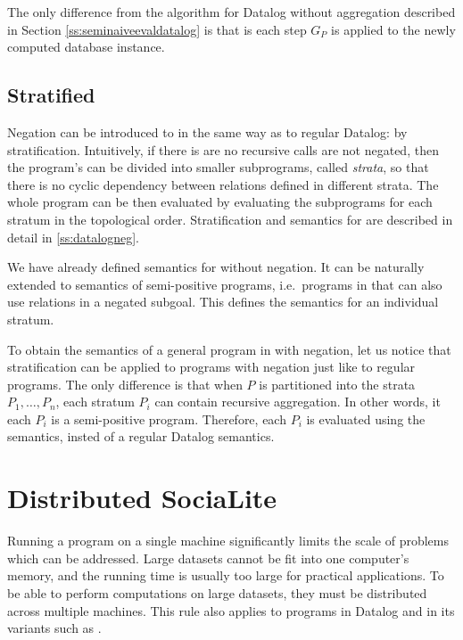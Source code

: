 The only difference from the algorithm for Datalog without aggregation described in Section \ref{ss:seminaiveevaldatalog} is that is each step $G_P$ is applied to the newly computed database instance.

\subsection{Stratified \datalogra}
Negation can be introduced to \datalogra in the same way as to regular Datalog: by stratification. Intuitively, if there is are no recursive calls are not negated, then the program's can be divided into smaller subprograms, called \emph{strata}, so that there is no cyclic dependency between relations defined in different strata. The whole program can be then evaluated by evaluating the subprograms for each stratum in the topological order. Stratification and semantics for \datalogneg are described in detail in \ref{ss:datalogneg}.

We have already defined semantics for \datalogra without negation. It can be naturally extended to semantics of semi-positive \datalogra programs, i.e.\ programs in \datalogra that can also use \edb relations in a negated subgoal. This defines the semantics for an individual stratum.

To obtain the semantics of a general program in \datalogra with negation, let us notice that stratification can be applied to \datalogra programs with negation just like to regular \datalogneg programs. The only difference is that when $P$ is partitioned into the strata $P_1, \dots, P_n$, each stratum $P_i$ can contain recursive aggregation. In other words, it each $P_i$ is a semi-positive \datalogra program. Therefore, each $P_i$ is evaluated using the \datalogra semantics, insted of a regular Datalog semantics.


\section{Distributed SociaLite}\label{s:distributed}
Running a program on a single machine significantly limits the scale of problems which can be addressed. Large datasets cannot be fit into one computer's memory, and the running time is usually too large for practical applications. To be able to perform computations on large datasets, they must be distributed across multiple machines. This rule also applies to programs in Datalog and in its variants such as \datalogra.

